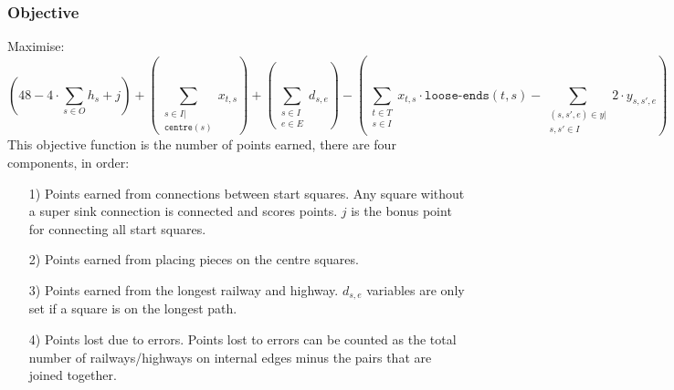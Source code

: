\documentclass[11pt,a4paper]{article}
\begin{document}
\subsubsection*{Objective}
Maximise:
$$\left( 48 - 4 \cdot \sum_{s \in O} h_s + j \right) + 
\left( \sum_{\substack{s \in I | \\ \texttt{centre}(s)}}x_{t,s} \right) + 
\left( \sum_{\substack{s \in I \\ e \in E}}d_{s,e} \right) - 
\left( \sum_{\substack{t \in T \\ s \in I}}x_{t,s}\cdot \texttt{loose-ends}(t,s) - \sum_{\substack{(s,s',e) \in y | \\ s,s' \in I}}2 \cdot y_{s,s',e} \right)$$
This objective function is the number of points earned, there are four components, in order:
\begin{itemize}
\item[1)] Points earned from connections between start squares.
Any square without a super sink connection is connected and scores points. 
$j$ is the bonus point for connecting all start squares.
\item[2)] Points earned from placing pieces on the centre squares.
\item[3)] Points earned from the longest railway and highway. 
$d_{s,e}$ variables are only set if a square is on the longest path. 
\item[4)] Points lost due to errors.
Points lost to errors can be counted as the total number of railways/highways on internal edges minus the pairs that are joined together.
\end{itemize}
\end{document}
